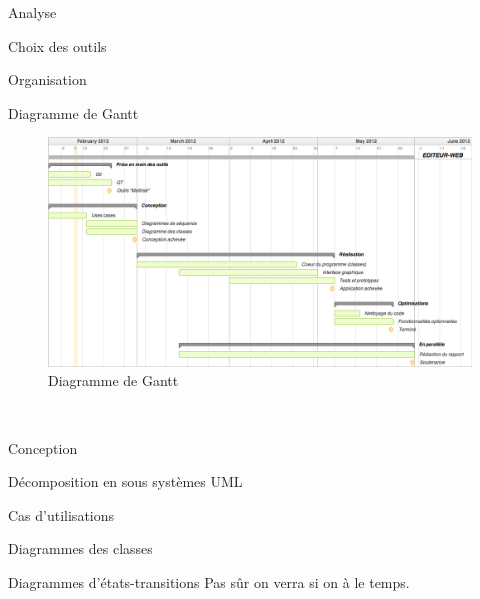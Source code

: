 \documentclass[a4paper, 12pt]{report}
\begin{document}
\begin{part}{Analyse}
\begin{chapter}{Choix des outils}
		\end{chapter}
		\begin{chapter}{Organisation}
		\begin{section}{Diagramme de Gantt}
				\begin{figure}[h]
					\begin{center}
						\includegraphics[width=17cm]{DiagrammeGantt.png}
						\caption{Diagramme de Gantt}
					\end{center}
				\end{figure}~\\
			\end{section}
		\end{chapter}
	\end{part}
	\begin{part}{Conception}
		\begin{chapter}{Décomposition en sous systèmes}
					\gls{UML}
		\end{chapter}
		\begin{chapter}{Cas d'utilisations}
		
		\end{chapter}
		\begin{chapter}{Diagrammes des classes}
		
		\end{chapter}
		\begin{chapter}{Diagrammes d'états-transitions}
			Pas sûr on verra si on à le temps.
		\end{chapter}
	\end{part}
\end{document}
